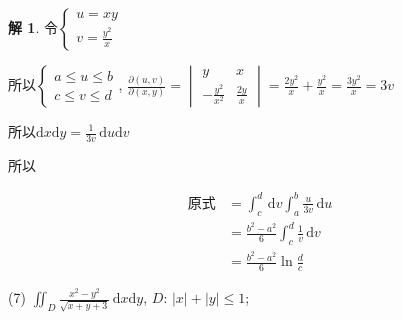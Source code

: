 \documentclass[a4paper,12pt]{article}
\theoremstyle{definition}
\newtheorem*{sol}{解}
\begin{document}
\begin{sol}
    令$\begin{cases}
            u=xy \\
            v=\frac{y^2}{x}
        \end{cases}$

    所以$\begin{cases}
            a\leq u\leq b \\
            c\leq v\leq d
        \end{cases}$, $\frac{\partial(u,v)}{\partial(x,y)}=\begin{vmatrix}
            y                & x            \\
            -\frac{y^2}{x^2} & \frac{2y}{x}
        \end{vmatrix}=\frac{2y^2}{x}+\frac{y^2}{x}=\frac{3y^2}{x}=3v$

    所以$\mathrm{d}x\mathrm{d}y=\frac{1}{3v}\,\mathrm{d}u\mathrm{d}v$

    所以

    \begin{align*}
        \text{原式}
         & =\int_c^d\,\mathrm{d}v\int_a^b\frac{u}{3v}\,\mathrm{d}u \\
         & =\frac{b^2-a^2}{6}\int_c^d\frac{1}{v}\,\mathrm{d}v      \\
         & =\frac{b^2-a^2}{6}\ln\frac{d}{c}
    \end{align*}
\end{sol}
(7) $\displaystyle\iint_{D} \frac{x^2 - y^2}{\sqrt{x + y + 3}}\,\mathrm{d}x\mathrm{d}y$, $D$: $|x| + |y| \leq 1$;
\end{document}
